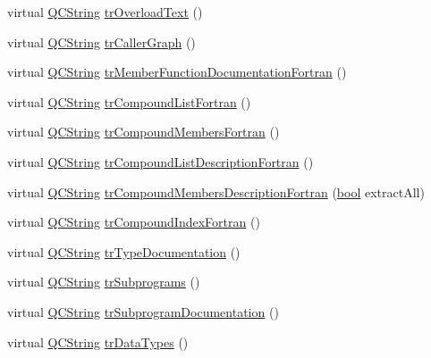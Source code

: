 \begin{DoxyCompactItemize}
\item 
virtual \hyperlink{class_q_c_string}{Q\+C\+String} \hyperlink{class_translator_chinesetraditional_ab1da30c765db6204b17c0f406692caa8}{tr\+Overload\+Text} ()
\item 
virtual \hyperlink{class_q_c_string}{Q\+C\+String} \hyperlink{class_translator_chinesetraditional_aaacafeecebb203594afc68e25cc8ce02}{tr\+Caller\+Graph} ()
\item 
virtual \hyperlink{class_q_c_string}{Q\+C\+String} \hyperlink{class_translator_chinesetraditional_a8cefb650274dea8420f41b59f3fd4410}{tr\+Member\+Function\+Documentation\+Fortran} ()
\item 
virtual \hyperlink{class_q_c_string}{Q\+C\+String} \hyperlink{class_translator_chinesetraditional_a99bee7a174f4065eddc040aa6a83cdcd}{tr\+Compound\+List\+Fortran} ()
\item 
virtual \hyperlink{class_q_c_string}{Q\+C\+String} \hyperlink{class_translator_chinesetraditional_a8ee7e0f388ea12d59b3759558f796513}{tr\+Compound\+Members\+Fortran} ()
\item 
virtual \hyperlink{class_q_c_string}{Q\+C\+String} \hyperlink{class_translator_chinesetraditional_a4189f4826592b973a95a57d271eb4f5b}{tr\+Compound\+List\+Description\+Fortran} ()
\item 
virtual \hyperlink{class_q_c_string}{Q\+C\+String} \hyperlink{class_translator_chinesetraditional_a94e67a603f3cc7363b43c2a59fb2c768}{tr\+Compound\+Members\+Description\+Fortran} (\hyperlink{qglobal_8h_a1062901a7428fdd9c7f180f5e01ea056}{bool} extract\+All)
\item 
virtual \hyperlink{class_q_c_string}{Q\+C\+String} \hyperlink{class_translator_chinesetraditional_ab2091400b7f82668c9a865415554f078}{tr\+Compound\+Index\+Fortran} ()
\item 
virtual \hyperlink{class_q_c_string}{Q\+C\+String} \hyperlink{class_translator_chinesetraditional_aadf1f95dcc6f412dba64f55769148294}{tr\+Type\+Documentation} ()
\item 
virtual \hyperlink{class_q_c_string}{Q\+C\+String} \hyperlink{class_translator_chinesetraditional_a2a39bf72af7b4051d6e4c22138eb2bb2}{tr\+Subprograms} ()
\item 
virtual \hyperlink{class_q_c_string}{Q\+C\+String} \hyperlink{class_translator_chinesetraditional_ab08b94b628f2e02f09e3a02d4b8f85ae}{tr\+Subprogram\+Documentation} ()
\item 
virtual \hyperlink{class_q_c_string}{Q\+C\+String} \hyperlink{class_translator_chinesetraditional_a9b06a74c7f0ac92241fa1ab21ea9115e}{tr\+Data\+Types} ()

\end{DoxyCompactItemize}
